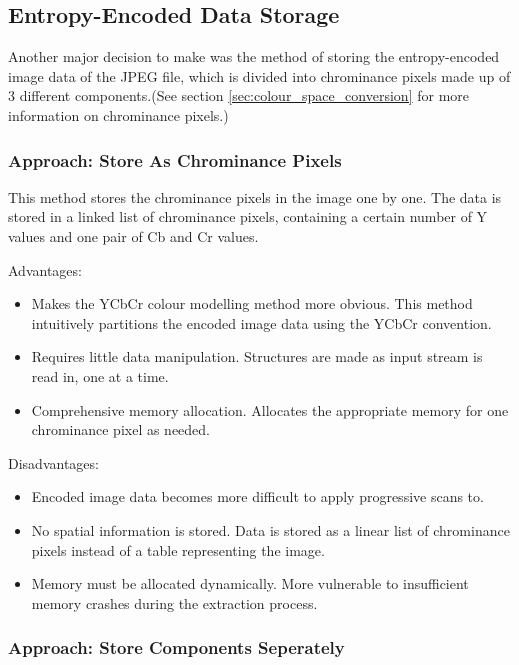 \subsection{Entropy-Encoded Data Storage}

Another major decision to make was the method of 
storing the entropy-encoded image data of the JPEG file, 
which is divided into chrominance pixels made up of 
3 different components.(See section 
\ref{sec:colour_space_conversion} for
more information on chrominance pixels.)

\subsubsection{Approach: Store As Chrominance Pixels}

This method stores the chrominance pixels in 
the image one by one. 
The data is stored in a linked list of chrominance pixels, 
containing a certain number of Y values and 
one pair of Cb and Cr values.

Advantages:
\begin{itemize}
	\item Makes the YCbCr colour modelling method 
		more obvious. 
		This method intuitively partitions the 
		encoded image data using the YCbCr convention.
	\item Requires little data manipulation. 
		Structures are made as input stream is read in, 
		one at a time.
	\item Comprehensive memory allocation. 
		Allocates the appropriate memory for 
		one chrominance pixel as needed.
\end{itemize}

Disadvantages:
\begin{itemize}
	\item Encoded image data becomes more 
		difficult to apply progressive scans to.
	\item No spatial information is stored. 
		Data is stored as a linear list of chrominance 
		pixels instead of a table representing the image.
	\item Memory must be allocated dynamically. 
		More vulnerable to insufficient memory 
		crashes during the extraction process.
\end{itemize}

\subsubsection{Approach: Store Components Seperately}

